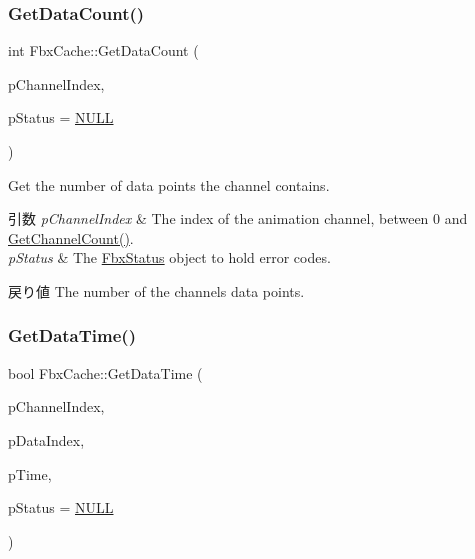 \subsubsection{\texorpdfstring{Get\+Data\+Count()}{GetDataCount()}}
{\footnotesize\ttfamily int Fbx\+Cache\+::\+Get\+Data\+Count (\begin{DoxyParamCaption}\item[{int}]{p\+Channel\+Index,  }\item[{\hyperlink{class_fbx_status}{Fbx\+Status} $\ast$}]{p\+Status = {\ttfamily \hyperlink{fbxarch_8h_a070d2ce7b6bb7e5c05602aa8c308d0c4}{N\+U\+LL}} }\end{DoxyParamCaption})}

Get the number of data points the channel contains. 
\begin{DoxyParams}{引数}
{\em p\+Channel\+Index} & The index of the animation channel, between 0 and \hyperlink{class_fbx_cache_a1e2a07637eec39ae1eefb85fa29bc552}{Get\+Channel\+Count()}. \\
\hline
{\em p\+Status} & The \hyperlink{class_fbx_status}{Fbx\+Status} object to hold error codes. \\
\hline
\end{DoxyParams}
\begin{DoxyReturn}{戻り値}
The number of the channel\textquotesingle{}s data points. 
\end{DoxyReturn}
\mbox{\label{class_fbx_cache_a75e249b339bf5a2b1d4f713ee6697e2a}} 
\subsubsection{\texorpdfstring{Get\+Data\+Time()}{GetDataTime()}}
{\footnotesize\ttfamily bool Fbx\+Cache\+::\+Get\+Data\+Time (\begin{DoxyParamCaption}\item[{int}]{p\+Channel\+Index,  }\item[{unsigned int}]{p\+Data\+Index,  }\item[{\hyperlink{class_fbx_time}{Fbx\+Time} \&}]{p\+Time,  }\item[{\hyperlink{class_fbx_status}{Fbx\+Status} $\ast$}]{p\+Status = {\ttfamily \hyperlink{fbxarch_8h_a070d2ce7b6bb7e5c05602aa8c308d0c4}{N\+U\+LL}} }\end{DoxyParamCaption})}


